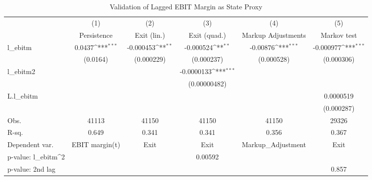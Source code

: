 \begin{table}[htbp]\centering
\def\sym#1{\ifmmode^{#1}\else\(^{#1}\)\fi}
\caption{Validation of Lagged EBIT Margin as State Proxy}
\begin{tabular}{l*{5}{c}}
\toprule
                    &\multicolumn{1}{c}{(1)}&\multicolumn{1}{c}{(2)}&\multicolumn{1}{c}{(3)}&\multicolumn{1}{c}{(4)}&\multicolumn{1}{c}{(5)}\\
                    &\multicolumn{1}{c}{Persistence}&\multicolumn{1}{c}{Exit (lin.)}&\multicolumn{1}{c}{Exit (quad.)}&\multicolumn{1}{c}{Markup Adjustments}&\multicolumn{1}{c}{Markov test}\\
\midrule
l\_ebitm             &      0.0437\sym{***}&   -0.000453\sym{**} &   -0.000524\sym{**} &    -0.00876\sym{***}&   -0.000977\sym{***}\\
                    &    (0.0164)         &  (0.000229)         &  (0.000237)         &  (0.000528)         &  (0.000306)         \\
\addlinespace
l\_ebitm2            &                     &                     &  -0.0000133\sym{***}&                     &                     \\
                    &                     &                     &(0.00000482)         &                     &                     \\
\addlinespace
L.l\_ebitm           &                     &                     &                     &                     &   0.0000519         \\
                    &                     &                     &                     &                     &  (0.000287)         \\
\midrule
Obs.                &       41113         &       41150         &       41150         &       41150         &       29326         \\
R-sq.               &       0.649         &       0.341         &       0.341         &       0.356         &       0.367         \\
Dependent var.      &EBIT margin(t)         &        Exit         &        Exit         &Markup\_Adjustment         &        Exit         \\
p-value: l\_ebitm^2  &                     &                     &     0.00592         &                     &                     \\
p-value: 2nd lag    &                     &                     &                     &                     &       0.857         \\

\end{tabular}
\end{table}
